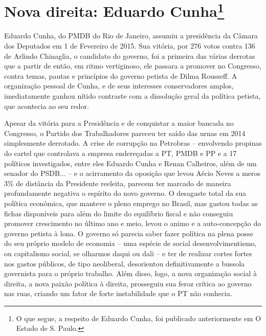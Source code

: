 \chapter[Nova direita: Eduardo Cunha]{Nova direita: Eduardo
Cunha\footnote{O que segue, a respeito de Eduardo Cunha, foi publicado
  anteriormente em O Estado de S. Paulo.}}\label{nova-direita-eduardo-cunha}

Eduardo Cunha, do PMDB do Rio de Janeiro, assumiu a presidência da
Câmara dos Deputados em 1 de Fevereiro de 2015. Sua vitória, por 276
votos contra 136 de Arlindo Chinaglia, o candidato do governo, foi a
primeira das várias derrotas que a partir de então, em ritmo
vertiginoso, ele passara a promover no Congresso, contra temas, pautas e
princípios do governo petista de Dilma Rousseff. A organização pessoal
de Cunha, e de seus interesses conservadores amplos, imediatamente
ganhou nítido contraste com a dissolução geral da política petista, que
acontecia ao seu redor.

Apesar da vitória para a Presidência e de conquistar a maior bancada no
Congresso, o Partido dos Trabalhadores pareceu ter saído das urnas em
2014 simplesmente derrotado. A crise de corrupção na Petrobras --
envolvendo propinas do cartel que controlava a empresa endereçadas a PT,
PMDB e PP e a 17 políticos investigados, entre eles Eduardo Cunha e
Renan Calheiros, além de um senador do PSDB... -- e o acirramento da
oposição que levou Aécio Neves a meros 3\% de distância da Presidente
reeleita, parecem ter marcado de maneira profundamente negativa o
espírito do novo governo. O desagaste total da sua política econômica,
que manteve o pleno emprego no Brasil, mas gastou todas as fichas
disponíveis para além do limite do equilíbrio fiscal e não conseguiu
promover crescimento no último ano e meio, levou o animo e a
auto-concepção do governo petista à lona. O governo só parecia saber
fazer política na plena posse do seu próprio modelo de economia -- uma
espécie de social desenvolvimentismo, ou capitalismo social, se olharmos
daqui ou dali -- e ter de realizar cortes fortes nos gastos públicos, de
tipo neoliberal, desorientou definitivamente a bussola governista para o
próprio trabalho. Além disso, logo, a nova organização social à direita,
a nova paixão política à direita, prosseguiu sua feroz crítica ao
governo nas ruas, criando um fator de forte instabilidade que o PT não
conhecia.

